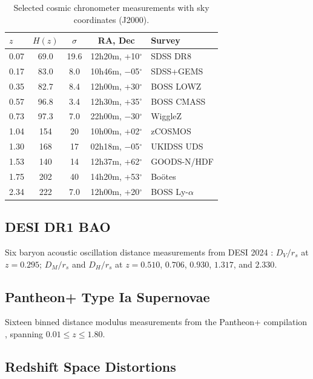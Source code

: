 \documentclass[twocolumn,prd,superscriptaddress,nofootinbib]{revtex4-2}
\begin{document}
\begin{table}[h]
\caption{Selected cosmic chronometer measurements with sky coordinates (J2000).}
\label{tab:cc_data}
\begin{ruledtabular}
\begin{tabular}{lcccl}
$z$ & $H(z)$ & $\sigma$ & RA, Dec & Survey \\
\hline
0.07 & 69.0 & 19.6 & 12h20m, +10$^\circ$ & SDSS DR8 \\
0.17 & 83.0 & 8.0 & 10h46m, $-$05$^\circ$ & SDSS+GEMS \\
0.35 & 82.7 & 8.4 & 12h00m, +30$^\circ$ & BOSS LOWZ \\
0.57 & 96.8 & 3.4 & 12h30m, +35$^\circ$ & BOSS CMASS \\
0.73 & 97.3 & 7.0 & 22h00m, $-$30$^\circ$ & WiggleZ \\
1.04 & 154 & 20 & 10h00m, +02$^\circ$ & zCOSMOS \\
1.30 & 168 & 17 & 02h18m, $-$05$^\circ$ & UKIDSS UDS \\
1.53 & 140 & 14 & 12h37m, +62$^\circ$ & GOODS-N/HDF \\
1.75 & 202 & 40 & 14h20m, +53$^\circ$ & Bo\"otes \\
2.34 & 222 & 7.0 & 12h00m, +20$^\circ$ & BOSS Ly-$\alpha$ \\
\end{tabular}
\end{ruledtabular}
\end{table}

\subsection{DESI DR1 BAO}

Six baryon acoustic oscillation distance measurements from DESI 2024 \cite{DESI2024}: $D_V/r_s$ at $z = 0.295$; $D_M/r_s$ and $D_H/r_s$ at $z = 0.510$, $0.706$, $0.930$, $1.317$, and $2.330$.

\subsection{Pantheon+ Type Ia Supernovae}

Sixteen binned distance modulus measurements from the Pantheon+ compilation \cite{Scolnic2022}, spanning $0.01 \leq z \leq 1.80$.

\subsection{Redshift Space Distortions}
\end{document}
